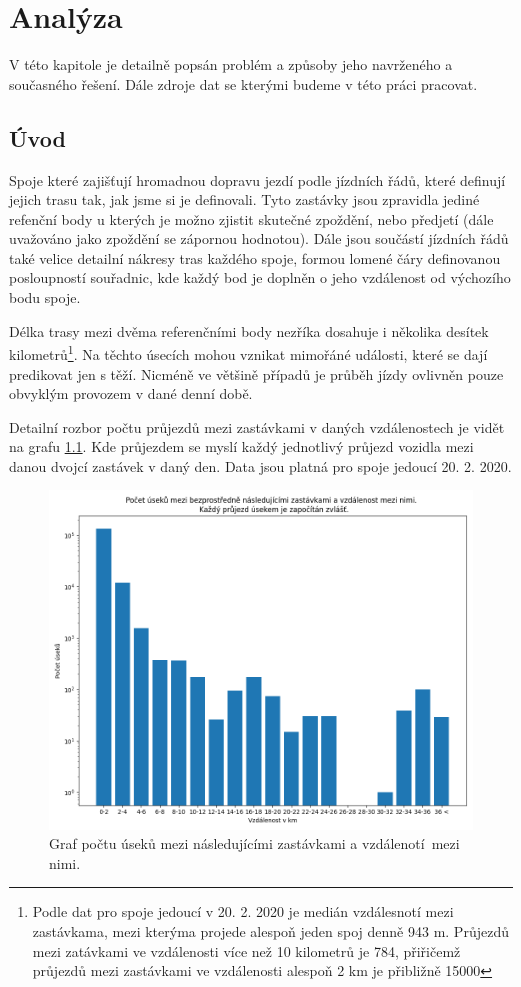 
\chapter{Analýza}

V této kapitole je detailně popsán problém a způsoby jeho navrženého a současného řešení. Dále zdroje dat se kterými budeme v této práci pracovat.

\section{Úvod}

Spoje které zajišťují hromadnou dopravu jezdí podle jízdních řádů, které definují jejich trasu tak, jak jsme si je definovali. Tyto zastávky jsou zpravidla jediné refenční body u kterých je možno zjistit skutečné zpoždění, nebo předjetí (dále uvažováno jako zpoždění se zápornou hodnotou). Dále jsou součástí jízdních řádů také velice detailní nákresy tras každého spoje, formou lomené čáry definovanou posloupností souřadnic, kde každý bod je doplněn o jeho vzdálenost od výchozího bodu spoje.

\bigbreak

Délka trasy mezi dvěma referenčními body nezříka dosahuje i několika desítek kilometrů\footnote{Podle dat pro spoje jedoucí v 20. 2. 2020 je medián vzdálesnotí mezi zastávkama, mezi kterýma projede alespoň jeden spoj denně 943 m. Průjezdů mezi zatávkami ve vzdálenosti více než 10 kilometrů je 784, přiřičemž průjezdů mezi zastávkami ve vzdálenosti alespoň 2 km je přibližně 15000}. Na těchto úsecích mohou vznikat mimořáné události, které se dají predikovat jen s těží. Nicméně ve většině případů je průběh jízdy ovlivněn pouze obvyklým provozem v dané denní době.

Detailní rozbor počtu průjezdů mezi zastávkami v daných vzdálenostech je vidět na grafu \ref{fig:stop_distances_result}. Kde průjezdem se myslí každý jednotlivý průjezd vozidla mezi danou dvojcí zastávek v daný den. Data jsou platná pro spoje jedoucí 20. 2. 2020.

\begin{figure}
	\centering
  \includegraphics[width=0.6\linewidth]{../img/stop_distances_plot_2020-02-20.png}
  \caption{Graf počtu úseků mezi následujícími zastávkami a vzdálenotí mezi nimi.}
  \label{fig:stop_distances_result}
\end{figure}

